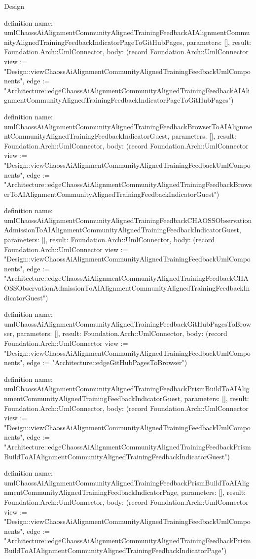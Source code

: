 \begin{lexlean}{Design}
\begin{semanticmodule}
definition{
  name: umlChaossAiAlignmentCommunityAlignedTrainingFeedbackAIAlignmentCommunityAlignedTrainingFeedbackIndicatorPageToGitHubPages,
  parameters: [],
  result: Foundation.Arch::UmlConnector,
  body: (record Foundation.Arch::UmlConnector {view := "Design::viewChaossAiAlignmentCommunityAlignedTrainingFeedbackUmlComponents", edge := "Architecture::edgeChaossAiAlignmentCommunityAlignedTrainingFeedbackAIAlignmentCommunityAlignedTrainingFeedbackIndicatorPageToGitHubPages"})
}

definition{
  name: umlChaossAiAlignmentCommunityAlignedTrainingFeedbackBrowserToAIAlignmentCommunityAlignedTrainingFeedbackIndicatorGuest,
  parameters: [],
  result: Foundation.Arch::UmlConnector,
  body: (record Foundation.Arch::UmlConnector {view := "Design::viewChaossAiAlignmentCommunityAlignedTrainingFeedbackUmlComponents", edge := "Architecture::edgeChaossAiAlignmentCommunityAlignedTrainingFeedbackBrowserToAIAlignmentCommunityAlignedTrainingFeedbackIndicatorGuest"})
}

definition{
  name: umlChaossAiAlignmentCommunityAlignedTrainingFeedbackCHAOSSObservationAdmissionToAIAlignmentCommunityAlignedTrainingFeedbackIndicatorGuest,
  parameters: [],
  result: Foundation.Arch::UmlConnector,
  body: (record Foundation.Arch::UmlConnector {view := "Design::viewChaossAiAlignmentCommunityAlignedTrainingFeedbackUmlComponents", edge := "Architecture::edgeChaossAiAlignmentCommunityAlignedTrainingFeedbackCHAOSSObservationAdmissionToAIAlignmentCommunityAlignedTrainingFeedbackIndicatorGuest"})
}

definition{
  name: umlChaossAiAlignmentCommunityAlignedTrainingFeedbackGitHubPagesToBrowser,
  parameters: [],
  result: Foundation.Arch::UmlConnector,
  body: (record Foundation.Arch::UmlConnector {view := "Design::viewChaossAiAlignmentCommunityAlignedTrainingFeedbackUmlComponents", edge := "Architecture::edgeGitHubPagesToBrowser"})
}

definition{
  name: umlChaossAiAlignmentCommunityAlignedTrainingFeedbackPrismBuildToAIAlignmentCommunityAlignedTrainingFeedbackIndicatorGuest,
  parameters: [],
  result: Foundation.Arch::UmlConnector,
  body: (record Foundation.Arch::UmlConnector {view := "Design::viewChaossAiAlignmentCommunityAlignedTrainingFeedbackUmlComponents", edge := "Architecture::edgeChaossAiAlignmentCommunityAlignedTrainingFeedbackPrismBuildToAIAlignmentCommunityAlignedTrainingFeedbackIndicatorGuest"})
}

definition{
  name: umlChaossAiAlignmentCommunityAlignedTrainingFeedbackPrismBuildToAIAlignmentCommunityAlignedTrainingFeedbackIndicatorPage,
  parameters: [],
  result: Foundation.Arch::UmlConnector,
  body: (record Foundation.Arch::UmlConnector {view := "Design::viewChaossAiAlignmentCommunityAlignedTrainingFeedbackUmlComponents", edge := "Architecture::edgeChaossAiAlignmentCommunityAlignedTrainingFeedbackPrismBuildToAIAlignmentCommunityAlignedTrainingFeedbackIndicatorPage"})
}


\end{semanticmodule}
\end{lexlean}
